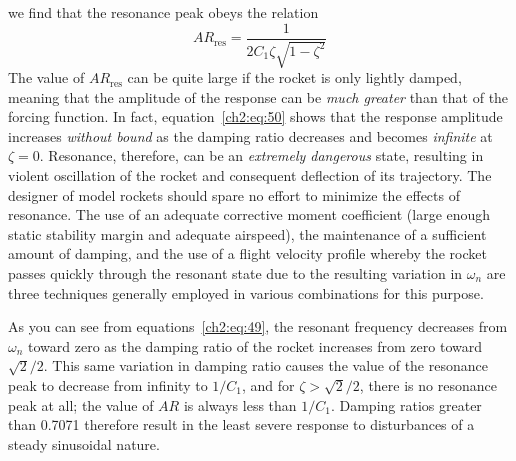 we find that the resonance peak obeys the relation
\begin{equation}\label{ch2:eq:50}
\mathit{AR}_{\mathrm{res}} = \frac{1}{2C_1\zeta\sqrt{1 - \zeta^{2}}}
\end{equation}
The value of $\mathit{AR}_{\mathrm{res}}$ can be quite large if the rocket is only
lightly damped, meaning that the amplitude of the response can be \emph{much
greater} than that of the forcing function. In fact,
equation~\eqref{ch2:eq:50} shows that the response amplitude increases
\emph{without bound} as the damping ratio decreases and becomes
\emph{infinite} at $\zeta = 0$. Resonance, therefore, can be an
\emph{extremely dangerous} state, resulting in violent oscillation of the
rocket and consequent deflection of its trajectory. The designer of model
rockets should spare no effort to minimize the effects of resonance. The use
of an adequate corrective moment coefficient (large enough static stability
margin and adequate airspeed), the maintenance of a sufficient amount of
damping, and the use of a flight velocity profile whereby the rocket passes
quickly through the resonant state due to the resulting variation in
$\omega_n$ are three techniques generally employed in various combinations for
this purpose.

As you can see from equations~\eqref{ch2:eq:49}, the resonant frequency
decreases from $\omega_n$ toward zero as the damping ratio of the rocket
increases from zero toward $\sqrt{2}/2$. This same variation in damping ratio
causes the value of the resonance peak to decrease from infinity to $1/C_1$,
and for $\zeta > \sqrt{2}/2$, there is no resonance peak at all; the value of
$\mathit{AR}$ is always less than $1/C_1$. Damping ratios greater than 0.7071
therefore result in the least severe response to disturbances of a steady
sinusoidal nature.
